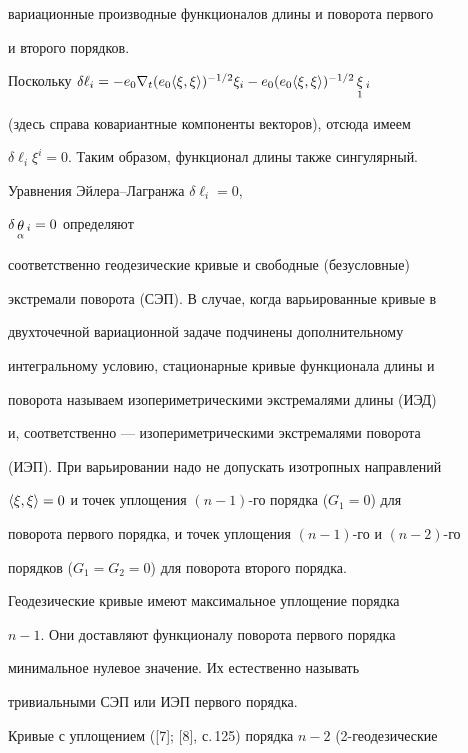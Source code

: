 вариационные производные функционалов длины и поворота первого 


и второго порядков. 


 


Поскольку $\delta\ell_i=-e_0\nabla_t(e_0\la\xi,\xi\ra)^{-1/2} 


\xi_i-e_0(e_0\la\xi,\xi\ra)^{-1/2}\mymath{\xi}_1{}_i$ 


(здесь справа ковариантные компоненты векторов), отсюда имеем 


$\delta\ell_i\xi^i=0$. Таким образом, функционал длины также сингулярный. 





Уравнения Эйлера--Лагранжа $\delta\ell_i=0$, 


$\delta\mathop{\theta}\limits_\alpha{}_i=0$ определяют 


соответственно геодезические кривые и свободные (безусловные) 


экстремали поворота (СЭП). В случае, когда варьированные кривые в 


двухточечной вариационной задаче подчинены дополнительному 


интегральному условию, стационарные кривые функционала длины и 


поворота называем изопериметрическими экстремалями длины (ИЭД) 


и, соответственно --- изопериметрическими экстремалями поворота 


(ИЭП). При варьировании надо не допускать изотропных направлений 


$\langle\xi,\xi\rangle=0$ и точек уплощения $(n-1)$-го порядка ($G_1=0$) для 


поворота первого порядка, и точек уплощения $(n-1)$-го и $(n-2)$-го 


порядков ($G_1=G_2=0$) для поворота второго порядка. 


 


Геодезические кривые имеют максимальное уплощение порядка 


$n-1$. Они доставляют функционалу поворота первого порядка 


минимальное нулевое значение. Их естественно называть 


тривиальными СЭП или ИЭП первого порядка. 


 


Кривые с уплощением ([7]; [8], с.\,125) порядка $n-2$ (2-геодезические 


